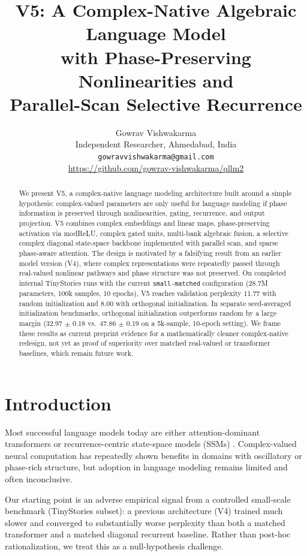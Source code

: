 \documentclass[11pt]{article}
\title{V5: A Complex-Native Algebraic Language Model\\
with Phase-Preserving Nonlinearities and\\
Parallel-Scan Selective Recurrence}
\author{
Gowrav Vishwakarma\\
Independent Researcher, Ahmedabad, India\\
\texttt{gowravvishwakarma@gmail.com}\\
\url{https://github.com/gowrav-vishwakarma/qllm2}
}
\date{}
\begin{document}
\maketitle

\begin{abstract}
We present V5, a complex-native language modeling architecture built around a simple hypothesis: complex-valued parameters are only useful for language modeling if phase information is preserved through nonlinearities, gating, recurrence, and output projection.
V5 combines complex embeddings and linear maps, phase-preserving activation via modReLU, complex gated units, multi-bank algebraic fusion, a selective complex diagonal state-space backbone implemented with parallel scan, and sparse phase-aware attention.
The design is motivated by a falsifying result from an earlier model version (V4), where complex representations were repeatedly passed through real-valued nonlinear pathways and phase structure was not preserved.
On completed internal TinyStories runs with the current \texttt{small-matched} configuration (28.7M parameters, 100k samples, 10 epochs), V5 reaches validation perplexity 11.77 with random initialization and 8.00 with orthogonal initialization.
In separate seed-averaged initialization benchmarks, orthogonal initialization outperforms random by a large margin (32.97 $\pm$ 0.18 vs.\ 47.86 $\pm$ 0.19 on a 5k-sample, 10-epoch setting).
We frame these results as current preprint evidence for a mathematically cleaner complex-native redesign, not yet as proof of superiority over matched real-valued or transformer baselines, which remain future work.
\end{abstract}

\section{Introduction}
Most successful language models today are either attention-dominant transformers \citep{vaswani2017attention} or recurrence-centric state-space models (SSMs) \citep{gu2021s4,gu2023mamba,dao2024transformersaressms}. Complex-valued neural computation has repeatedly shown benefits in domains with oscillatory or phase-rich structure, but adoption in language modeling remains limited and often inconclusive.

Our starting point is an adverse empirical signal from a controlled small-scale benchmark (TinyStories subset): a previous architecture (V4) trained much slower and converged to substantially worse perplexity than both a matched transformer and a matched diagonal recurrent baseline.
Rather than post-hoc rationalization, we treat this as a null-hypothesis challenge.
\end{document}
